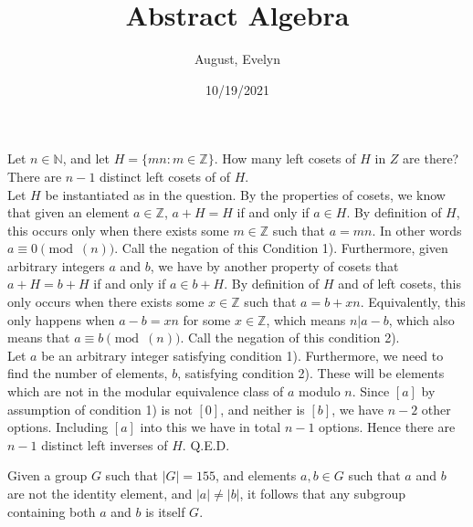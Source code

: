 \documentclass{article}
\title{Abstract Algebra}
\author{August, Evelyn}
\date{10/19/2021}
\newcommand{\N}{\mathbb{N}}
\newcommand{\Z}{\mathbb{Z}}
\begin{document}
\maketitle


 Let $n\in \N$, and let $H = \{mn: m\in \Z\}$. How many left cosets of $H$ in $Z$ are there?\\

 There are $n-1$ distinct left cosets of of $H$.\\

 Let $H$ be instantiated as in the question. By the properties of cosets, we know that given an element $a\in \Z$, $a+H = H$ if and only if $a\in H$. By definition of $H$, this occurs only when there exists some $m\in \Z$ such that $a = mn$. In other words $a\equiv 0\pmod(n)$. Call the negation of this Condition 1). Furthermore, given arbitrary integers $a$ and $b$, we have by another property of cosets that $a+H = b+ H$ if and only if $a\in b+H$. By definition of $H$ and of left cosets, this only occurs when there exists some $x\in \Z$ such that $a = b + xn$. Equivalently, this only happens when $a-b = xn$ for some $x\in \Z$, which means $n|a-b$, which also means that $a\equiv b\pmod(n)$. Call the negation of this condition 2). \\

Let $a$ be an arbitrary integer satisfying condition 1). Furthermore, we need to find the number of elements, $b$, satisfying condition 2). These will be elements which are not in the modular equivalence class of $a$ modulo $n$. Since $[a]$ by assumption of condition 1) is not $[0]$, and neither is $[b]$, we have $n-2$ other options. Including $[a]$ into this we have in total $n-1$ options. Hence there are $ n-1$ distinct left inverses of $H$. Q.E.D.


 Given a group $G$ such that $|G| = 155$, and elements $a,b\in G$ such that $a$ and $b$ are not the identity element, and $|a|\ne |b|$, it follows that any subgroup containing both $a$ and $b$ is itself $G$.\\
\end{document}
